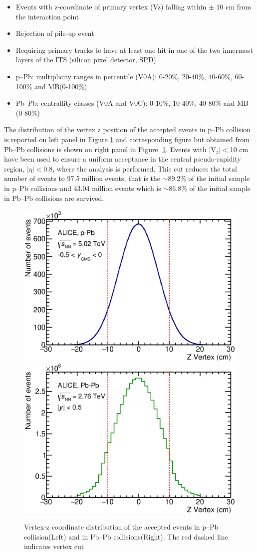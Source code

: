 \begin{itemize}
\item Events with z-coordinate of primary vertex (Vz) falling within $\pm$ 10 cm from the interaction point  
\item Rejection of pile-up event 
\item Requiring primary tracks to have at least one hit in one of the two innermost layers of the ITS (silicon pixel detector, SPD) 
\item p--Pb: multiplicity ranges in percentile (V0A): 0-20\%, 20-40\%, 40-60\%, 60-100\% and MB(0-100\%) 
\item Pb--Pb: centrallity classes (V0A and V0C): 0-10\%, 10-40\%, 40-80\% and MB (0-80\%)  
\end{itemize}


The distribution of the vertex z position of the accepted events in p--Pb collision is reported on left panel in Figure \ref{fig:VzDistribution} and corresponding figure but obtained from Pb--Pb collisions is shown on right panel in Figure. \ref{fig:VzDistribution}. Events with $|$V$_{z}|<$10 cm have been used to ensure a uniform acceptance in the central pseudo-rapidity region, $|\eta|<$0.8, where the analysis is performed. This cut reduces the total number of events to 97.5 million events, that is the $\sim$89.2\% of the initial sample in p--Pb collisions and 43.04 million events which is $\sim$86.8\% of the initial sample in Pb--Pb collisions are survived.


\begin{figure}[htbp]
\begin{center}
\includegraphics[width=7.cm]{./Version1/FigChapter5/Selection/pPbVertexZ.eps}
\hspace{0.5cm}
\includegraphics[width=7.cm]{./Version1/FigChapter5/Selection/PbPbVertexZ.eps}
\caption{Vertex-z coordinate distribution of the accepted events in p--Pb collision(Left) and in Pb--Pb collisions(Right). The red dashed line indicates vertex cut }
\label{fig:VzDistribution}
\end{center}
\end{figure}

